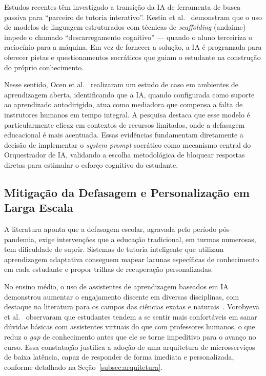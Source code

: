\documentclass[10pt, a4paper, twocolumn]{article}
\begin{document}
Estudos recentes têm investigado a transição da IA de ferramenta de busca
passiva para ``parceiro de tutoria interativo''. Kestin et
al.~\cite{kestin2025} demonstram que o uso de modelos de linguagem estruturados
com técnicas de \textit{scaffolding} (andaime) impede o chamado
``descarregamento cognitivo'' --- quando o aluno terceiriza o raciocínio para a
máquina. Em vez de fornecer a solução, a IA é programada para oferecer pistas e
questionamentos socráticos que guiam o estudante na construção do próprio
conhecimento.

Nesse sentido, Ocen et al.~\cite{ocen2026} realizaram um estudo de caso em
ambientes de aprendizagem aberta, identificando que a IA, quando configurada
como suporte ao aprendizado autodirigido, atua como mediadora que compensa a
falta de instrutores humanos em tempo integral. A pesquisa destaca que esse
modelo é particularmente eficaz em contextos de recursos limitados, onde a
defasagem educacional é mais acentuada. Essas evidências fundamentam diretamente
a decisão de implementar o \textit{system prompt} socrático como mecanismo
central do Orquestrador de IA, validando a escolha metodológica de bloquear
respostas diretas para estimular o esforço cognitivo do estudante.

\subsection{Mitigação da Defasagem e Personalização em Larga Escala}

A literatura aponta que a defasagem escolar, agravada pelo período
pós-pandemia, exige intervenções que a educação tradicional, em turmas
numerosas, tem dificuldade de suprir. Sistemas de tutoria inteligente que
utilizam aprendizagem adaptativa conseguem mapear lacunas específicas de
conhecimento em cada estudante e propor trilhas de recuperação personalizadas.

No ensino médio, o uso de assistentes de aprendizagem baseados em IA demonstrou
aumentar o engajamento discente em diversas disciplinas, com destaque na
literatura para os campos das ciências exatas e naturais~\cite{roe2025}.
Vorobyeva et al.~\cite{roe2025} observaram que estudantes tendem a se sentir
mais confortáveis em sanar dúvidas básicas com assistentes virtuais do que com
professores humanos, o que reduz o \textit{gap} de conhecimento antes que ele se
torne impeditivo para o avanço no curso. Essa constatação justifica a adoção de
uma arquitetura de microsserviços de baixa latência, capaz de responder de forma
imediata e personalizada, conforme detalhado na Seção~\ref{subsec:arquitetura}.
\end{document}
